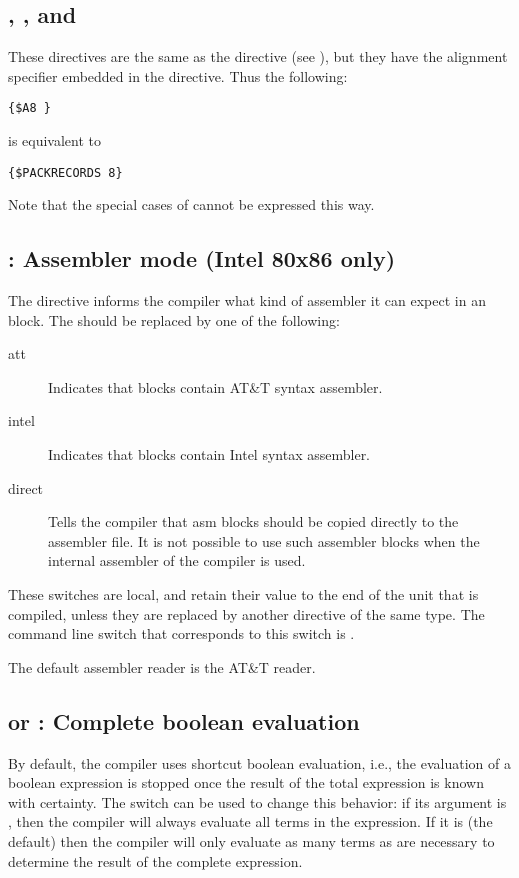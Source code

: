 \subsection{, , and }
\label{se:An}

These directives are the same as the  directive 
(see ), but they have the alignment specifier embedded in the
directive. Thus the following:
\begin{verbatim}
{$A8 }
\end{verbatim}
is equivalent to 
\begin{verbatim}
{$PACKRECORDS 8}
\end{verbatim}
Note that the special cases of  cannot be expressed this
way.

\subsection{ : Assembler mode (Intel 80x86 only)}
\label{se:AsmReader}


The  directive informs the compiler what kind of assembler
it can expect in an  block. The  should be replaced by one
of the following:
\begin{description}
\item [att\ ] Indicates that  blocks contain AT\&T syntax assembler.
\item [intel\ ] Indicates that  blocks contain Intel syntax
assembler.
\item [direct\ ] Tells the compiler that asm blocks should be copied
directly to the assembler file. It is not possible to use such assembler
blocks when the internal assembler of the compiler is used.
\end{description}
These switches are local, and retain their value to the end of the unit that
is compiled, unless they are replaced by another directive of the same type.
The command line switch that corresponds to this switch is .

The default assembler reader is the AT\&T reader.

\subsection{ or  : Complete boolean evaluation}

By default, the compiler uses shortcut boolean evaluation, i.e., the evaluation
of a boolean expression is stopped once the result of the total
expression is known with certainty. The  switch can be used
to change this behavior: if its argument is \var{+}, then the
compiler will always evaluate all terms in the expression. If it is
\var{-} (the default) then the compiler will only evaluate as many
terms as are necessary to determine the result of the complete expression.

